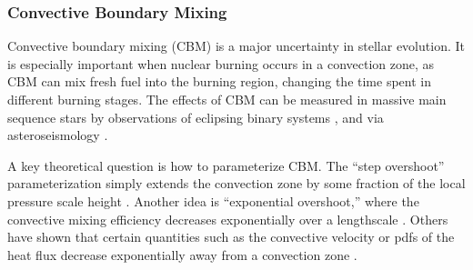 {\color{purple}
\subsubsection{Convective Boundary Mixing}
}

Convective boundary mixing (CBM) is a major uncertainty in stellar evolution. It is especially important when nuclear burning occurs in a convection zone, as CBM can mix fresh fuel into the burning region, changing the time spent in different burning stages. The effects of CBM can be measured in massive main sequence stars by observations of eclipsing binary systems \cite[e.g.,][]{Stancliffe_2015,Valle_2016}, and via asteroseismology \citep[e.g.,][]{Ghasemi_2016}.

A key theoretical question is how to parameterize CBM. The ``step overshoot'' parameterization simply extends the convection zone by some fraction of the local pressure scale height \cite[e.g.,][]{Shaviv_1973}. Another idea is ``exponential overshoot,'' where the convective mixing efficiency decreases exponentially over a lengthscale \cite{Freytag1996}. Others have shown that certain quantities such as the convective velocity or pdfs of the heat flux decrease exponentially away from a convection zone \cite{Pratt_2017}.